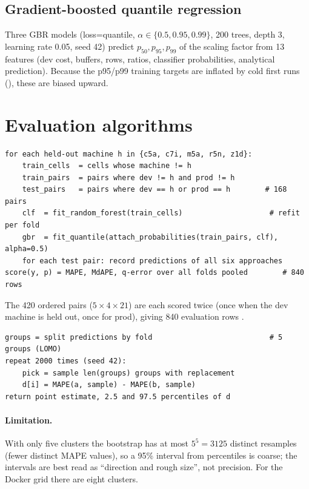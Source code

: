 \subsection{Gradient-boosted quantile regression}
Three GBR models (loss=quantile, $\alpha\in\{0.5,0.95,0.99\}$, 200 trees, depth 3, learning rate 0.05, seed 42) predict $p_{50},p_{95},p_{99}$ of
the scaling factor from 13 features (dev cost, buffers, rows, ratios, classifier probabilities, analytical prediction).
Because the p95/p99 training targets are inflated by cold first runs (), these are biased upward.

\section{Evaluation algorithms}
\begin{lstlisting}[language=pseudo,caption={Leakage-free leave-one-machine-out evaluation (\texttt{canonical\_evaluation.run\_cv}, l.\,239--296).},label=lst:lomo]
for each held-out machine h in {c5a, c7i, m5a, r5n, z1d}:
    train_cells  = cells whose machine != h
    train_pairs  = pairs where dev != h and prod != h
    test_pairs   = pairs where dev == h or prod == h        # 168 pairs
    clf  = fit_random_forest(train_cells)                    # refit per fold
    gbr  = fit_quantile(attach_probabilities(train_pairs, clf), alpha=0.5)
    for each test pair: record predictions of all six approaches
score(y, p) = MAPE, MdAPE, q-error over all folds pooled        # 840 rows
\end{lstlisting}
The 420 ordered pairs ($5\times4\times21$) are each scored twice (once when the dev machine is held out, once
for prod), giving 840 evaluation rows \evCODE.

\begin{lstlisting}[language=pseudo,caption={Paired cluster bootstrap on the MAPE difference (l.\,306--328).},label=lst:boot]
groups = split predictions by fold                           # 5 groups (LOMO)
repeat 2000 times (seed 42):
    pick = sample len(groups) groups with replacement
    d[i] = MAPE(a, sample) - MAPE(b, sample)
return point estimate, 2.5 and 97.5 percentiles of d
\end{lstlisting}
\paragraph{Limitation.} With only five clusters the bootstrap has at most $5^5=3125$ distinct resamples (fewer
distinct MAPE values), so a 95\% interval from percentiles is coarse; the intervals are best read as ``direction and
rough size'', not precision. For the Docker grid there are eight clusters.

